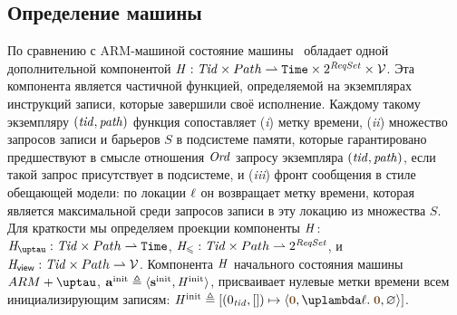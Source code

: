 \subsection{Определение машины \ARMt}
По сравнению с ARM-машиной
состояние машины \ARMt~обладает одной дополнительной компонентой
$\mathit{H} : \mathit{Tid} \times Path \rightharpoonup \mathtt{Time} \times 2^{\mathit{ReqSet}} \times \mathcal{V}$.
Эта компонента является частичной функцией, определяемой на экземплярах инструкций
записи, которые завершили своё исполнение.
Каждому такому экземпляру $(\mathit{tid}, \mathit{path})$ функция сопоставляет
(\emph{i}) метку времени,
(\emph{ii}) множество запросов записи и барьеров $S$ в подсистеме памяти,
которые гарантировано предшествуют в смысле отношения $\mathit{Ord}$ запросу экземпляра $(\mathit{tid}, \mathit{path})$,
если такой запрос присутствует в подсистеме,
и (\emph{iii}) фронт сообщения в стиле обещающей модели:
по локации $\ell$ он возвращает метку времени, которая является максимальной среди запросов записи
в эту локацию из множества $S$.
Для краткости мы определяем проекции компоненты $\mathit{H}$:
$\tmap: \Tid \times \Path \rightharpoonup \Timestamp$,
$\mathit{H}_{\leqslant}: \mathit{Tid} \times Path \rightharpoonup 2^{\mathit{ReqSet}}$, и
$\mathit{H}_{\mathsf{view}}: \mathit{Tid} \times Path \rightharpoonup \mathcal{V}$.
Компонента $\mathit{H}$ начального состояния машины $\ARMt$,
$\mathbf{a}^{\rm init} \triangleq \langle \mathbf{s}^{\rm init}, \mathit{H}^{\rm init} \rangle$,
присваивает нулевые метки времени всем инициализирующим записям:
$\hmap^{\rm init} \triangleq [(0_{\tId}, []) \mapsto
  \angled{\tstamp{0}, \lambda \loc. \; \tstamp{0}, \emptyset}]$.

